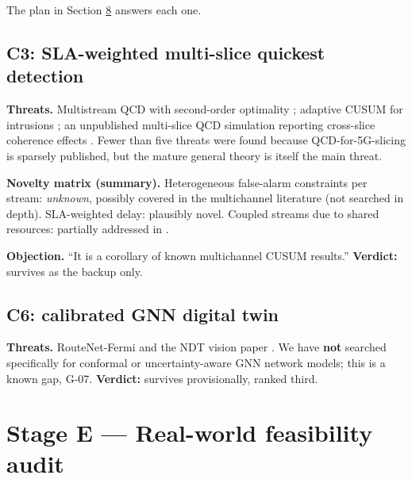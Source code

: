 The plan in Section \protect\hyperlink{sec:rec}{8} answers each one.

\hypertarget{c3-sla-weighted-multi-slice-quickest-detection}{%
\subsection{C3: SLA-weighted multi-slice quickest
detection}\label{c3-sla-weighted-multi-slice-quickest-detection}}

\textbf{Threats.} Multistream QCD with second-order optimality
\citep{fellouris2016second}; adaptive CUSUM for intrusions
\citep{tartakovsky2006novel}; an unpublished multi-slice QCD simulation
reporting cross-slice coherence effects \citep{qcdslice_github}. Fewer
than five threats were found because QCD-for-5G-slicing is sparsely
published, but the mature general theory is itself the main threat.

\textbf{Novelty matrix (summary).} Heterogeneous false-alarm constraints
per stream: \emph{unknown}, possibly covered in the multichannel
literature (not searched in depth). SLA-weighted delay: plausibly novel.
Coupled streams due to shared resources: partially addressed in
\citep{qcdslice_github}.

\textbf{Objection.} ``It is a corollary of known multichannel CUSUM
results.'' \textbf{Verdict:} survives as the backup only.

\hypertarget{c6-calibrated-gnn-digital-twin}{%
\subsection{C6: calibrated GNN digital
twin}\label{c6-calibrated-gnn-digital-twin}}

\textbf{Threats.} RouteNet-Fermi \citep{ferriolgalmes2023routenetfermi}
and the NDT vision paper \citep{almasan2022ndt}. We have \textbf{not}
searched specifically for conformal or uncertainty-aware GNN network
models; this is a known gap, G-07. \textbf{Verdict:} survives
provisionally, ranked third.

\hypertarget{sec:feas}{%
\section{Stage E --- Real-world feasibility audit}\label{sec:feas}}

